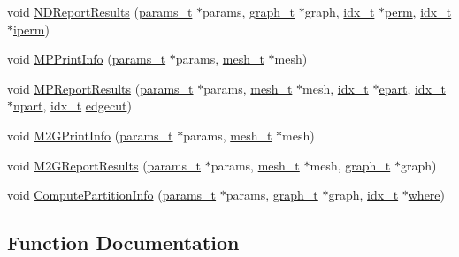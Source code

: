 \begin{DoxyCompactItemize}
\item 
void \hyperlink{a00948_ae474b9ac69c59e61afcdd45e4c2913f0}{N\+D\+Report\+Results} (\hyperlink{a00706}{params\+\_\+t} $\ast$params, \hyperlink{a00734}{graph\+\_\+t} $\ast$graph, \hyperlink{a00876_aaa5262be3e700770163401acb0150f52}{idx\+\_\+t} $\ast$\hyperlink{a00879_ab96e9eb84fc7c342d17690a1341645dd}{perm}, \hyperlink{a00876_aaa5262be3e700770163401acb0150f52}{idx\+\_\+t} $\ast$\hyperlink{a00879_a76ba0ee1ced7914ce87ac7eab1758c42}{iperm})
\item 
void \hyperlink{a00948_a921bb5a29825f90d7095365cc3e92bdc}{M\+P\+Print\+Info} (\hyperlink{a00706}{params\+\_\+t} $\ast$params, \hyperlink{a00738}{mesh\+\_\+t} $\ast$mesh)
\item 
void \hyperlink{a00948_a236149f75cde8a4272e20cdcad0b9db2}{M\+P\+Report\+Results} (\hyperlink{a00706}{params\+\_\+t} $\ast$params, \hyperlink{a00738}{mesh\+\_\+t} $\ast$mesh, \hyperlink{a00876_aaa5262be3e700770163401acb0150f52}{idx\+\_\+t} $\ast$\hyperlink{a00879_a3be6f43a8ac8840d4c97578068513c18}{epart}, \hyperlink{a00876_aaa5262be3e700770163401acb0150f52}{idx\+\_\+t} $\ast$\hyperlink{a00879_aa5e2883dfb3577926b3b5842698947bc}{npart}, \hyperlink{a00876_aaa5262be3e700770163401acb0150f52}{idx\+\_\+t} \hyperlink{a00879_a8e62a902298dd5fd88ef554d5277b1dc}{edgecut})
\item 
void \hyperlink{a00948_ac1de26132f220c8648448493e1c701c3}{M2\+G\+Print\+Info} (\hyperlink{a00706}{params\+\_\+t} $\ast$params, \hyperlink{a00738}{mesh\+\_\+t} $\ast$mesh)
\item 
void \hyperlink{a00948_a1830d2cc04f766d0cf9f16cbf81d0a4b}{M2\+G\+Report\+Results} (\hyperlink{a00706}{params\+\_\+t} $\ast$params, \hyperlink{a00738}{mesh\+\_\+t} $\ast$mesh, \hyperlink{a00734}{graph\+\_\+t} $\ast$graph)
\item 
void \hyperlink{a00948_a16087d53e4f04771ed2ffbd810711cba}{Compute\+Partition\+Info} (\hyperlink{a00706}{params\+\_\+t} $\ast$params, \hyperlink{a00734}{graph\+\_\+t} $\ast$graph, \hyperlink{a00876_aaa5262be3e700770163401acb0150f52}{idx\+\_\+t} $\ast$\hyperlink{a00879_a7a355801f721e9d8d4ae03590a3a56b0}{where})
\end{DoxyCompactItemize}


\subsection{Function Documentation}
\mbox{\label{a00948_a929cf6af13d6bf71bc61657211472eed}} 
